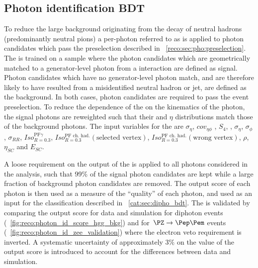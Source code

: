 \subsection{Photon identification BDT}
To reduce the large background originating from the decay of neutral hadrons (predominantly neutral pions) a per-photon \BDT referred to as \PhoIdBdt is applied to photon candidates which pass the preselection described in \Sec~\ref{reco:sec:pho:preselection}. The \PhoIdBdt is trained on a \gammaJet sample where the photon candidates which are geometrically matched to a generator-level photon from a \pp interaction are defined as signal. Photon candidates which have no generator-level photon match, and are therefore likely to have resulted from a misidentified neutral hadron or jet, are defined as the background. In both cases, photon candidates are required to pass the event preselection. To reduce the dependence of the \PhoIdBdt on the kinematics of the photon, the signal photons are reweighted such that their \pT and $\eta$ distributions match those of the background photons. The input variables for the \PhoIdBdt are $\sigma_{\eta}$, $cov_{\eta \phi}$ , $S_{4} $, \RNINE , $\sigma_{\eta} $, $\sigma_{\phi }$, $\sigma_{RR}$, $Iso^{\textrm{PF}\gamma}_{R=0.3}$, $Iso^{\textrm{PF ch. had.}}_{R=0.3}(\textrm{selected vertex})$, $Iso^{\textrm{PF ch. had.}}_{R=0.3}(\textrm{wrong vertex})$, $\rho$, $\eta_{SC}$ and $E_{SC}$. 

A loose requirement on the output of the \PhoIdBdt is applied to all photons considered in the analysis, such that 99\% of the signal photon candidates are kept while a large fraction of background photon candidates are removed. The \PhoIdBdt output score of each photon is then used as a measure of the ``quality'' of each photon, and used as an input for the classification \BDT described in \Sec~\ref{cat:sec:dipho_bdt}.
The \PhoIdBdt is validated by comparing the output score for data and simulation for diphoton events (\Fig~\ref{fig:reco:photon_id_score_hgg_bkg}) and for $\Zee$ events (\Fig~\ref{fig:reco:photon_id_zee_validation}) where the electron veto requirement is inverted. A systematic uncertainty of approximately $3\%$ on the value of the \PhoIdBdt output score is introduced to account for the differences between data and simulation.


